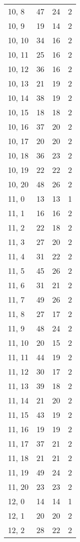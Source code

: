 \begin{table}
\begin{tabular}{llll}
10, 8  &   47 &   24 &     2 \\
10, 9  &   19 &   14 &     2 \\
10, 10 &   34 &   16 &     2 \\
10, 11 &   25 &   16 &     2 \\
10, 12 &   36 &   16 &     2 \\
10, 13 &   21 &   19 &     2 \\
10, 14 &   38 &   19 &     2 \\
10, 15 &   18 &   18 &     2 \\
10, 16 &   37 &   20 &     2 \\
10, 17 &   20 &   20 &     2 \\
10, 18 &   36 &   23 &     2 \\
10, 19 &   22 &   22 &     2 \\
10, 20 &   48 &   26 &     2 \\
11, 0  &   13 &   13 &     1 \\
11, 1  &   16 &   16 &     2 \\
11, 2  &   22 &   18 &     2 \\
11, 3  &   27 &   20 &     2 \\
11, 4  &   31 &   22 &     2 \\
11, 5  &   45 &   26 &     2 \\
11, 6  &   31 &   21 &     2 \\
11, 7  &   49 &   26 &     2 \\
11, 8  &   27 &   17 &     2 \\
11, 9  &   48 &   24 &     2 \\
11, 10 &   20 &   15 &     2 \\
11, 11 &   44 &   19 &     2 \\
11, 12 &   30 &   17 &     2 \\
11, 13 &   39 &   18 &     2 \\
11, 14 &   21 &   20 &     2 \\
11, 15 &   43 &   19 &     2 \\
11, 16 &   19 &   19 &     2 \\
11, 17 &   37 &   21 &     2 \\
11, 18 &   21 &   21 &     2 \\
11, 19 &   49 &   24 &     2 \\
11, 20 &   23 &   23 &     2 \\
12, 0  &   14 &   14 &     1 \\
12, 1  &   20 &   20 &     2 \\
12, 2  &   28 &   22 &     2 \\

\end{tabular}
\end{table}
